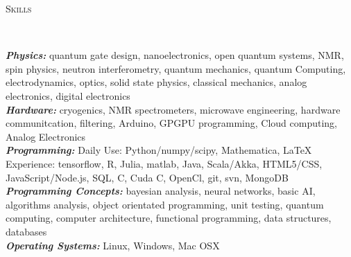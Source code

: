 \documentclass[9pt]{article}
\newenvironment{changemargin}[2]{%
  \begin{list}{}{%
    \setlength{\topsep}{0pt}%
    \setlength{\leftmargin}{#1}%
    \setlength{\rightmargin}{#2}%
    \setlength{\listparindent}{\parindent}%
    \setlength{\itemindent}{\parindent}%
    \setlength{\parsep}{\parskip}%
  }%
  \item[]}{\end{list}
}
\newcommand{\lineover}{
	\begin{changemargin}{-0.05in}{-0.05in}
		\vspace*{-8pt}
		\hrulefill \\
		\vspace*{-2pt}
	\end{changemargin}
}
\newcommand{\header}[1]{
	\begin{changemargin}{-0.5in}{-0.5in}
		\scshape{#1}\\
  	\lineover
	\end{changemargin}
}
\newenvironment{body} {
	\vspace*{-16pt}
	\begin{changemargin}{-0.25in}{-0.5in}
  }	
	{\end{changemargin}
}
\begin{document}
\smallskip








\header{Skills}

\begin{body}
	\vspace{14pt}

	\emph{\textbf{Physics:}}{} quantum gate design, nanoelectronics,
	open quantum systems, NMR, spin physics, neutron interferometry, quantum mechanics, quantum Computing, electrodynamics, optics, solid state physics, classical mechanics, analog electronics, digital electronics\\
	\medskip
	\emph{\textbf{Hardware:}}{}  cryogenics, NMR spectrometers, microwave engineering, hardware communitcation, 
	                 filtering, Arduino, GPGPU programming, Cloud computing, Analog Electronics\\
	\medskip
	\emph{\textbf{Programming:}}{} 
    Daily Use: Python/numpy/scipy, Mathematica, \LaTeX \\
    Experience: tensorflow, R, Julia, matlab, Java, Scala/Akka, HTML5/CSS, JavaScript/Node.js,
	SQL, C, Cuda C, OpenCl, git, svn, MongoDB\\
	\medskip
	\emph{\textbf{Programming Concepts:}}{} bayesian analysis, neural networks, basic AI, algorithms analysis, object orientated programming, unit testing, quantum
    computing, computer architecture, functional programming, data structures, databases\\

	
	\medskip
	\emph{\textbf{Operating Systems:}}{} Linux, Windows, Mac OSX\\

	

	
\end{body}
\end{document}

